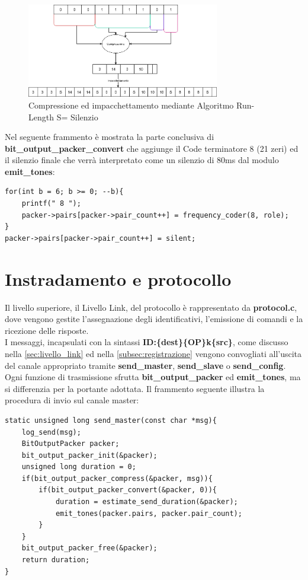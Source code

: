   \begin{figure}[H]
    \centering
    \includegraphics[width=0.75\textwidth]{immagini/run_length.png}
    \caption{Compressione ed impacchettamento mediante Algoritmo Run-Length S= Silenzio}
    \label{fig:run_length}
\end{figure}

   Nel seguente frammento  è mostrata la parte conclusiva di \textbf{bit\_output\_packer\_convert} che aggiunge il Code terminatore 8 (21 zeri) 
  ed il silenzio finale che verrà interpretato come un silenzio di 80ms dal modulo \textbf{emit\_tones}:

\begin{verbatim}
for(int b = 6; b >= 0; --b){
    printf(" 8 ");
    packer->pairs[packer->pair_count++] = frequency_coder(8, role);
}
packer->pairs[packer->pair_count++] = silent;
\end{verbatim}

\section{Instradamento e protocollo}

Il livello superiore, il Livello Link, del protocollo è rappresentato da \textbf{protocol.c}, dove vengono gestite l’assegnazione degli identificativi, 
l’emissione di comandi e la ricezione delle risposte. \\
I messaggi, incapsulati con la sintassi \textbf{ID:\{dest\}\{OP\}k\{src\}}, come discusso nella \autoref{sec:livello_link} ed nella \autoref{subsec:registrazione}
 vengono convogliati 
all’uscita del canale appropriato tramite \textbf{send\_master}, \textbf{send\_slave} o \textbf{send\_config}.\\
 Ogni funzione di trasmissione sfrutta 
\textbf{bit\_output\_packer} ed \textbf{emit\_tones}, ma si differenzia per la portante adottata.
\newpage
Il frammento seguente illustra la procedura di invio
 sul canale master:

\begin{verbatim}
static unsigned long send_master(const char *msg){
    log_send(msg);
    BitOutputPacker packer;
    bit_output_packer_init(&packer);
    unsigned long duration = 0;
    if(bit_output_packer_compress(&packer, msg)){
        if(bit_output_packer_convert(&packer, 0)){
            duration = estimate_send_duration(&packer);
            emit_tones(packer.pairs, packer.pair_count);
        }
    }
    bit_output_packer_free(&packer);
    return duration;
}
\end{verbatim}

